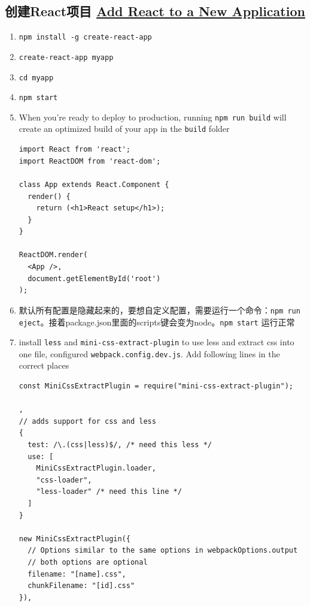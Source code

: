 \documentclass[a4paper, 12pt]{article}
\begin{document}
\subsection{创建React项目 \href{https://react.docschina.org/docs/add-react-to-a-new-app.html}{Add React to a New Application}}
\begin{enumerate}
\item \verb|npm install -g create-react-app|
\item \verb|create-react-app myapp|
\item \verb|cd myapp|
\item \verb|npm start|
\item When you're ready to deploy to production, running \verb|npm run build| will create an optimized build of your app in the \verb|build| folder
\begin{verbatim}
import React from 'react';
import ReactDOM from 'react-dom';

class App extends React.Component {
  render() {
    return (<h1>React setup</h1>);
  }
}

ReactDOM.render(
  <App />,
  document.getElementById('root')
);
\end{verbatim}

\item 默认所有配置是隐藏起来的，要想自定义配置，需要运行一个命令：\verb|npm run eject|。接着package.json里面的scripts键会变为node。\verb|npm start| 运行正常

\item install \verb|less| and \verb|mini-css-extract-plugin| to use less and extract css into one file, configured \verb|webpack.config.dev.js|. Add following lines in the correct places
\begin{verbatim}
const MiniCssExtractPlugin = require("mini-css-extract-plugin");

,
// adds support for css and less
{
  test: /\.(css|less)$/, /* need this less */
  use: [
    MiniCssExtractPlugin.loader,
    "css-loader",
    "less-loader" /* need this line */
  ]
}

new MiniCssExtractPlugin({
  // Options similar to the same options in webpackOptions.output
  // both options are optional
  filename: "[name].css",
  chunkFilename: "[id].css"
}),
\end{verbatim}




\end{enumerate}
\end{document}
